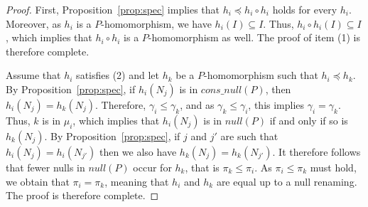 \begin{proof}
    First, Proposition~\ref{prop:spec} implies that $h_i \preceq h_i \circ h_i$ holds for every $h_i$.
    Moreover, as $h_i$ is a $P$-homomorphism, we have $h_i(I) \subseteq I$.
    Thus, $h_i \circ h_i(I) \subseteq I$, which implies that $h_i \circ h_i$ is a $P$-homomorphism as well.
    The proof of item (1) is therefore complete.

    Assume that $h_i$ satisfies (2) and let $h_k$ be a $P$-homomorphism such that $h_i \preceq h_k$.
    By Proposition~\ref{prop:spec}, if $h_i(N_j)$ is in $cons\_null(P)$, then $h_i(N_j)=h_k(N_j)$.
    Therefore, $\gamma_i \leq \gamma_k$, and as $\gamma_k \leq \gamma_i$, this implies $\gamma_i = \gamma_k$.
    Thus, $k$ is in $\mu_i$, which implies that $h_i(N_j)$ is in $null(P)$ if and only if so is $h_k(N_j)$.
    By Proposition~\ref{prop:spec}, if $j$ and $j'$ are such that $h_i(N_j)=h_i(N_{j'})$ then we also have $h_k(N_j)=h_k(N_{j'})$.
    It therefore follows that fewer nulls in $null(P)$ occur for $h_k$, that is $\pi_k \leq \pi_i$.
    As $\pi_i \leq \pi_k$ must hold, we obtain that $\pi_i = \pi_k$, meaning that $h_i$ and $h_k$ are equal up to a null renaming.
    The proof is therefore complete.
\end{proof}

